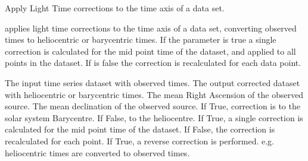 \begin{manroutinedescription}
        Apply Light Time corrections to the time axis of a data set.

        {} applies light time corrections to the time axis of a %
data
        set, converting observed times to heliocentric or barycentric
        times. If the parameter {} is true a single correction is
        calculated for the mid point time of the dataset, and applied to
        all points in the dataset. If {} is false the correction %
is
        recalculated for each data point.

\begin{manparametertable}
  The input %
time series dataset with
                               observed times.
  The %
output corrected dataset with heliocentric
                               or barycentric times.
     The {} mean Right %
Ascension of the
                               observed source.
     The {} mean %
declination of the observed
                               source.
  If True, correction is to the %
solar system
                               Barycentre. If False, to the heliocentre.
  If True, a single correction %
is calculated
                               for the mid point time of the dataset. If
                               False, the correction is recalculated for
                               each point.
  If True, a reverse %
correction is performed.
                               e.g. heliocentric times are converted to
                               observed times.

\end{manparametertable}
\end{manroutinedescription}

